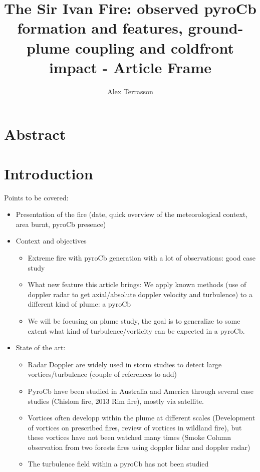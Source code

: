 \documentclass[12pt]{article}
\title{The Sir Ivan Fire: observed pyroCb formation and features, ground-plume coupling and coldfront impact - Article Frame}
\author{Alex Terrasson}
\begin{document}
\maketitle

\section{Abstract}

\section{Introduction}
Points to be covered:
\begin{itemize}
\item Presentation of the fire (date, quick overview of the meteorological context, area burnt, pyroCb presence)
\item Context and objectives
\begin{itemize}
\item Extreme fire with pyroCb generation with a lot of observations: good case study
\item What new feature this article brings: We apply known methods (use of doppler radar to get axial/absolute doppler velocity and turbulence) to a different kind of plume: a pyroCb
\item We will be focusing on plume study, the goal is to generalize to some extent what kind of turbulence/vorticity can be expected in a pyroCb.
\end{itemize}

\item State of the art:

\begin{itemize}
\item Radar Doppler are widely used in storm studies to detect large vortices/turbulence (couple of references to add)
\item PyroCb have been studied in Australia and America through several case studies (Chislom fire, 2013 Rim fire), mostly via satellite.
\item Vortices often developp within the plume at different scales (Development of vortices on prescribed fires, review of vortices in wildland fire), but these vortices have not been watched many times (Smoke Column observation from two forests fires using doppler lidar and doppler radar)
\item The turbulence field within a pyroCb has not been studied
\end{itemize}

\end{itemize}
\end{document}
